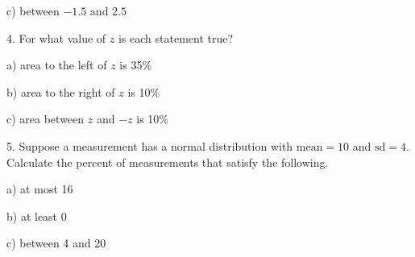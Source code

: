 \documentclass[10pt]{article}
\begin{document}
\hspace{10pt} c) between $-1.5$ and $2.5$
\vspace{1in}

4. For what value of $z$ is each statement true?

\hspace{10pt} a) area to the left of $z$ is 35\%
\vspace{.5in}

\hspace{10pt} b) area to the right of $z$ is 10\%
\vspace{.5in}

\hspace{10pt} c) area between $z$ and $-z$  is 10\%
\vspace{.5in}

5. Suppose a measurement has a normal distribution with $\mbox{mean}=10$ and $\mbox{{sd}}=4$.
Calculate the percent of measurements that satisfy the following.

\hspace{10pt} a) at most 16
\vspace{1in}

\hspace{10pt} b) at least 0
\vspace{1in}

\hspace{10pt} c) between 4 and 20
\vfill
\eject
\end{document}
